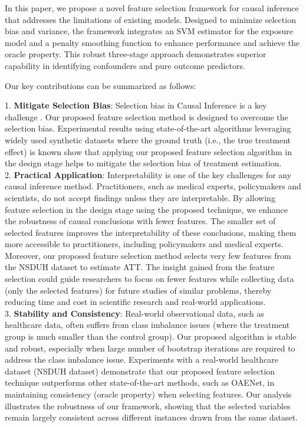 In this paper, we propose a novel feature selection framework for causal inference that addresses the limitations of existing models. Designed to minimize selection bias and variance, the framework integrates an SVM estimator for the exposure model and a penalty smoothing function to enhance performance and achieve the oracle property. This robust three-stage approach demonstrates superior capability in identifying confounders and pure outcome predictors.

Our key contributions can be summarized as follows:

1. \textbf{Mitigate Selection Bias}: Selection bias in Causal Inference is a key challenge \citep{vanderweele2019principles, wooldridge2016should, lu2020feature}. Our proposed feature selection method is designed to overcome the selection bias. Experimental results using state-of-the-art algorithms leveraging widely used synthetic datasets \citep{shortreed2017outcome, islam2021feature, wang2012bayesian} where the ground truth (i.e., the true treatment effect) is known show that applying our proposed feature selection algorithm in the design stage helps to mitigate the selection bias of treatment estimation.
\\ \hspace*{1em} 2. \textbf{Practical Application}: Interpretability is one of the key challenges for any causal inference method. Practitioners, such as medical experts, policymakers and scientists, do not accept findings unless they are interpretable. By allowing feature selection in the design stage using the proposed technique, we enhance the robustness of causal conclusions with fewer features. The smaller set of selected features improves the interpretability of these conclusions, making them more accessible to practitioners, including policymakers and medical experts. Moreover, our proposed feature selection method selects very few features from the NSDUH dataset to estimate ATT. The insight gained from the feature selection could guide researchers to focus on fewer features while collecting data (only the selected features) for future studies of similar problems, thereby reducing time and cost in scientific research and real-world applications. 
\\ \hspace*{1em}3. \textbf{Stability and Consistency}: Real-world observational data, such as healthcare data, often suffers from class imbalance issues (where the treatment group is much smaller than the control group). Our proposed algorithm is stable and robust, especially when large number of bootstrap iterations are required to address the class imbalance issue. Experiments with a real-world healthcare dataset (NSDUH dataset) demonstrate that our proposed feature selection technique outperforms other state-of-the-art methods, such as OAENet, in maintaining consistency (oracle property) when selecting features. Our analysis illustrates the robustness of our framework, showing that the selected variables remain largely consistent across different instances drawn from the same dataset.
